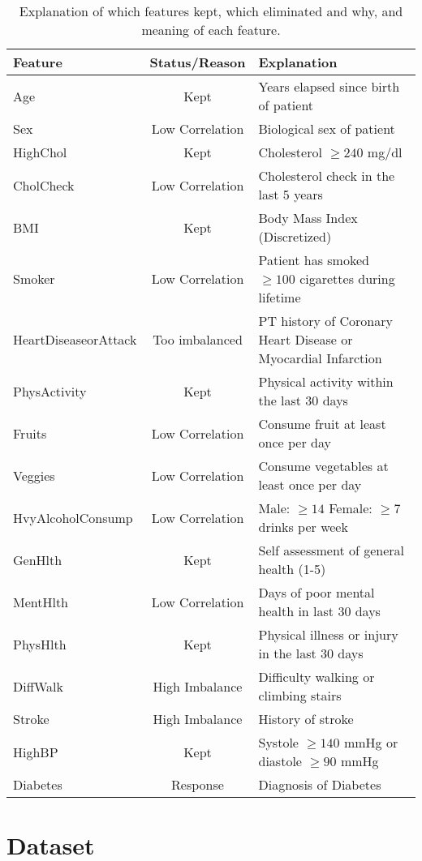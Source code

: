 \documentclass[journal]{IEEEtran}
\begin{document}
	\begin{table*}[h]
		\centering		
		\caption{Explanation of which features kept, which eliminated and why, and meaning of each feature.}
		\label{tab:features}
		\begin{tabular}{lcl}
			\toprule
			Feature & Status/Reason & Explanation \\
			\midrule
			Age			& Kept 				& Years elapsed since birth of patient \\
			Sex			& Low Correlation	& Biological sex of patient \\
			HighChol	& Kept 				& Cholesterol $\geq240$ mg/dl \\
			CholCheck	& Low Correlation	& Cholesterol check in the last 5 years \\
			BMI			& Kept 				& Body Mass Index (Discretized) \\
			Smoker		& Low Correlation	& Patient has smoked $\geq100$ cigarettes during lifetime\\
			HeartDiseaseorAttack & Too imbalanced & PT history of Coronary Heart Disease or Myocardial Infarction \\
			PhysActivity	& Kept 			& Physical activity within the last 30 days \\
			Fruits		& Low Correlation	& Consume fruit at least once per day \\
			Veggies		& Low Correlation	& Consume vegetables at least once per day\\
			HvyAlcoholConsump & Low Correlation & Male: $\geq14$ Female: $\geq7$ drinks per week \\
			GenHlth		& Kept 				& Self assessment of general health (1-5) \\
			MentHlth	& Low Correlation	& Days of poor mental health in last 30 days \\
			PhysHlth	& Kept				& Physical illness or injury in the last 30 days \\
			DiffWalk	& High Imbalance	& Difficulty walking or climbing stairs \\
			Stroke		& High Imbalance	& History of stroke\\
			HighBP		& Kept 				& Systole $\geq140$ mmHg or diastole $\geq90$ mmHg \\
			Diabetes 	& Response 			& Diagnosis of Diabetes \\
			\bottomrule
		\end{tabular}
	\end{table*}
	
	\section{Dataset}
	\label{sec:dataset}
	
\end{document}
